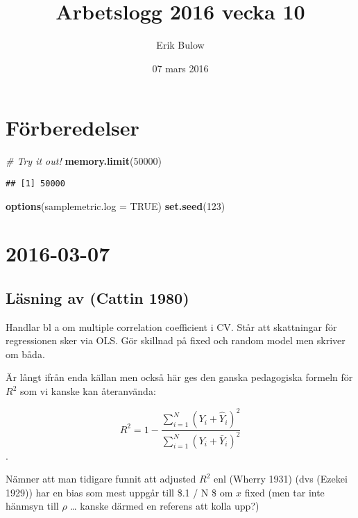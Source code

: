 \documentclass[]{article}
\title{Arbetslogg 2016 vecka 10}
\author{Erik Bulow}
\date{07 mars 2016}
\newenvironment{Shaded}{\begin{snugshade}}{\end{snugshade}}
\newcommand{\KeywordTok}[1]{\textcolor[rgb]{0.13,0.29,0.53}{\textbf{{#1}}}}
\newcommand{\DataTypeTok}[1]{\textcolor[rgb]{0.13,0.29,0.53}{{#1}}}
\newcommand{\DecValTok}[1]{\textcolor[rgb]{0.00,0.00,0.81}{{#1}}}
\newcommand{\CommentTok}[1]{\textcolor[rgb]{0.56,0.35,0.01}{\textit{{#1}}}}
\newcommand{\OtherTok}[1]{\textcolor[rgb]{0.56,0.35,0.01}{{#1}}}
\newcommand{\NormalTok}[1]{{#1}}
\begin{document}
\maketitle

{
\hypersetup{linkcolor=black}
\setcounter{tocdepth}{2}
\tableofcontents
}
\section{Förberedelser}\label{forberedelser}

\begin{Shaded}
\begin{Highlighting}[]
\CommentTok{# Try it out!}
\KeywordTok{memory.limit}\NormalTok{(}\DecValTok{50000}\NormalTok{)}
\end{Highlighting}
\end{Shaded}

\begin{verbatim}
## [1] 50000
\end{verbatim}

\begin{Shaded}
\begin{Highlighting}[]
\KeywordTok{options}\NormalTok{(}\DataTypeTok{samplemetric.log =} \OtherTok{TRUE}\NormalTok{)}
\KeywordTok{set.seed}\NormalTok{(}\DecValTok{123}\NormalTok{)}
\end{Highlighting}
\end{Shaded}

\section{2016-03-07}\label{section}

\subsection{Läsning av (Cattin 1980)}\label{lasning-av-cattin1980}

Handlar bl a om multiple correlation coefficient i CV. Står att
skattningar för regressionen sker via OLS. Gör skillnad på fixed och
random model men skriver om båda.

Är långt ifrån enda källan men också här ges den ganska pedagogiska
formeln för \(R^2\) som vi kanske kan återanvända:

\[R^2 = 1 - \frac{\sum_{i = 1}^N (Y_i + \hat{Y}_i)^2}{\sum_{i = 1}^N (Y_i + \bar{Y}_i)^2}\].

Nämner att man tidigare funnit att adjusted \(R^2\) enl (Wherry 1931)
(dvs (Ezekei 1929)) har en bias som mest uppgår till \$.1 / N \$ om
\(x\) fixed (men tar inte hänmsyn till \(\rho\) \ldots{} kanske därmed
en referens att kolla upp?)
\end{document}
